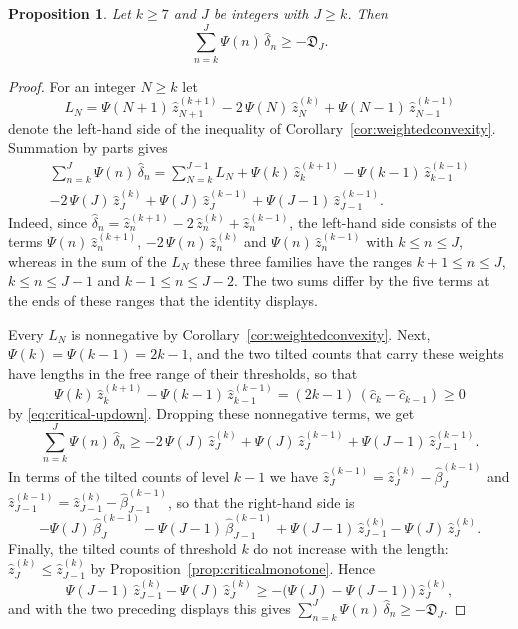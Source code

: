 \documentclass{amsart}
\newtheorem{proposition}[theorem]{Proposition}
\theoremstyle{definition}
\theoremstyle{remark}
\numberwithin{equation}{section}
\begin{document}
\begin{proposition}\label{prop:debt}
Let $k\ge 7$ and $J$ be integers with $J\ge k$. Then
\[
\sum_{n=k}^{J}\Psi(n)\,\hat\delta_n\ge-\mathfrak D_J .
\]
\end{proposition}

\begin{proof}
For an integer $N\ge k$ let
\[
L_N=\Psi(N+1)\,\hat z^{(k+1)}_{N+1}-2\,\Psi(N)\,\hat z^{(k)}_N+\Psi(N-1)\,\hat z^{(k-1)}_{N-1}
\]
denote the left-hand side of the inequality of Corollary~\ref{cor:weightedconvexity}. Summation by parts gives
\begin{multline*}
\sum_{n=k}^{J}\Psi(n)\,\hat\delta_n=\sum_{N=k}^{J-1}L_N+\Psi(k)\,\hat z^{(k+1)}_k-\Psi(k-1)\,\hat z^{(k-1)}_{k-1}\\
-2\,\Psi(J)\,\hat z^{(k)}_J+\Psi(J)\,\hat z^{(k-1)}_J+\Psi(J-1)\,\hat z^{(k-1)}_{J-1}.
\end{multline*}
Indeed, since $\hat\delta_n=\hat z^{(k+1)}_n-2\,\hat z^{(k)}_n+\hat z^{(k-1)}_n$, the left-hand side consists of the terms $\Psi(n)\,\hat z^{(k+1)}_n$, $-2\,\Psi(n)\,\hat z^{(k)}_n$ and $\Psi(n)\,\hat z^{(k-1)}_n$ with $k\le n\le J$, whereas in the sum of the $L_N$ these three families have the ranges $k+1\le n\le J$, $k\le n\le J-1$ and $k-1\le n\le J-2$. The two sums differ by the five terms at the ends of these ranges that the identity displays.

Every $L_N$ is nonnegative by Corollary~\ref{cor:weightedconvexity}. Next, $\Psi(k)=\Psi(k-1)=2k-1$, and the two tilted counts that carry these weights have lengths in the free range of their thresholds, so that
\[
\Psi(k)\,\hat z^{(k+1)}_k-\Psi(k-1)\,\hat z^{(k-1)}_{k-1}=(2k-1)\,(\hat c_k-\hat c_{k-1})\ge 0
\]
by \eqref{eq:critical-updown}. Dropping these nonnegative terms, we get
\[
\sum_{n=k}^{J}\Psi(n)\,\hat\delta_n\ge-2\,\Psi(J)\,\hat z^{(k)}_J+\Psi(J)\,\hat z^{(k-1)}_J+\Psi(J-1)\,\hat z^{(k-1)}_{J-1}.
\]
In terms of the tilted counts of level $k-1$ we have $\hat z^{(k-1)}_J=\hat z^{(k)}_J-\hat\beta^{(k-1)}_J$ and $\hat z^{(k-1)}_{J-1}=\hat z^{(k)}_{J-1}-\hat\beta^{(k-1)}_{J-1}$, so that the right-hand side is
\[
-\Psi(J)\,\hat\beta^{(k-1)}_J-\Psi(J-1)\,\hat\beta^{(k-1)}_{J-1}+\Psi(J-1)\,\hat z^{(k)}_{J-1}-\Psi(J)\,\hat z^{(k)}_J .
\]
Finally, the tilted counts of threshold $k$ do not increase with the length: $\hat z^{(k)}_J\le\hat z^{(k)}_{J-1}$ by Proposition~\ref{prop:criticalmonotone}. Hence
\[
\Psi(J-1)\,\hat z^{(k)}_{J-1}-\Psi(J)\,\hat z^{(k)}_J\ge-\bigl(\Psi(J)-\Psi(J-1)\bigr)\,\hat z^{(k)}_J,
\]
and with the two preceding displays this gives $\sum_{n=k}^{J}\Psi(n)\,\hat\delta_n\ge-\mathfrak D_J$.
\end{proof}
\end{document}
